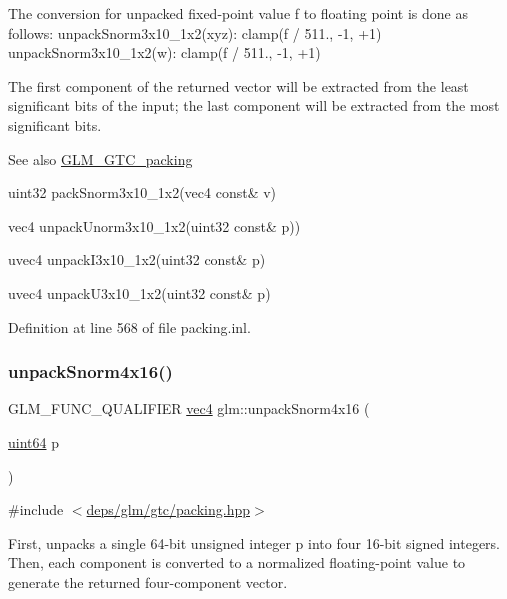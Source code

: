 The conversion for unpacked fixed-\/point value f to floating point is done as follows\+: unpack\+Snorm3x10\+\_\+1x2(xyz)\+: clamp(f / 511., -\/1, +1) unpack\+Snorm3x10\+\_\+1x2(w)\+: clamp(f / 511., -\/1, +1)

The first component of the returned vector will be extracted from the least significant bits of the input; the last component will be extracted from the most significant bits.

\begin{DoxySeeAlso}{See also}
\hyperlink{group__gtc__packing}{G\+L\+M\+\_\+\+G\+T\+C\+\_\+packing} 

uint32 pack\+Snorm3x10\+\_\+1x2(vec4 const\& v) 

vec4 unpack\+Unorm3x10\+\_\+1x2(uint32 const\& p)) 

uvec4 unpack\+I3x10\+\_\+1x2(uint32 const\& p) 

uvec4 unpack\+U3x10\+\_\+1x2(uint32 const\& p) 
\end{DoxySeeAlso}


Definition at line 568 of file packing.\+inl.

\mbox{\label{group__gtc__packing_ga1bfaa3f217fd7a4b6b9d3117ecb3fcac}} 
\subsubsection{\texorpdfstring{unpack\+Snorm4x16()}{unpackSnorm4x16()}}
{\footnotesize\ttfamily G\+L\+M\+\_\+\+F\+U\+N\+C\+\_\+\+Q\+U\+A\+L\+I\+F\+I\+ER \hyperlink{group__core__types_ga5881b1b022d7fd1b7218f5916532dd02}{vec4} glm\+::unpack\+Snorm4x16 (\begin{DoxyParamCaption}\item[{\hyperlink{group__gtc__type__precision_gae3632bf9b37da66233d78930dd06378a}{uint64}}]{p }\end{DoxyParamCaption})}



{\ttfamily \#include $<$\hyperlink{gtc_2packing_8hpp}{deps/glm/gtc/packing.\+hpp}$>$}

First, unpacks a single 64-\/bit unsigned integer p into four 16-\/bit signed integers. Then, each component is converted to a normalized floating-\/point value to generate the returned four-\/component vector.

